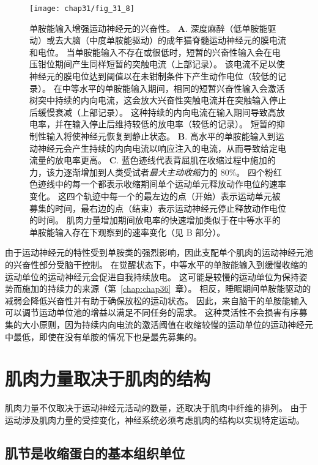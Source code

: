 \begin{figure}[htbp]
	\centering
	\texttt{[image: chap31/fig\_31\_8]}
	\caption{单胺能输入增强运动神经元的兴奋性\cite{heckman2009motoneuron,erim1996rank}。
	\textbf{A}. 深度麻醉（低单胺能驱动）或去大脑（中度单胺能驱动）的成年猫脊髓运动神经元的膜电流和电位。
	当单胺能输入不存在或很低时，短暂的兴奋性输入会在电压钳位期间产生同样短暂的突触电流（上部记录）。
	该电流不足以使神经元的膜电位达到阈值以在未钳制条件下产生动作电位（较低的记录）。
	在中等水平的单胺能输入期间，相同的短暂兴奋性输入会激活树突中持续的内向电流，这会放大兴奋性突触电流并在突触输入停止后缓慢衰减（上部记录）。
	这种持续的内向电流在输入期间导致高放电率，并在输入停止后维持较低的放电率（较低的记录）。
	短暂的抑制性输入将使神经元恢复到静止状态。
	\textbf{B}. 高水平的单胺能输入到运动神经元会产生持续的内向电流以响应注入的电流，从而导致给定电流量的放电率更高。
	\textbf{C}. 蓝色迹线代表背屈肌在收缩过程中施加的力，该力逐渐增加到人类受试者\textit{最大主动收缩}力的 80\%。
	四个粉红色迹线中的每一个都表示收缩期间单个运动单元释放动作电位的速率变化。 
	这四个轨迹中每一个的最左边的点（开始）表示运动单元被募集的时间，最右边的点（结束）表示运动神经元停止释放动作电位的时间。
	肌肉力量增加期间放电率的快速增加类似于在中等水平的单胺能输入存在下观察到的速率变化（见 B 部分）。}
	\label{fig:31_8}
\end{figure}


由于运动神经元的特性受到单胺类的强烈影响，因此支配单个肌肉的运动神经元池的兴奋性部分受脑干控制。
在觉醒状态下，中等水平的单胺能输入到缓慢收缩的运动单位的运动神经元会促进自我持续放电。
这可能是较慢的运动单位为保持姿势而施加的持续力的来源（第~\ref{chap:chap36}~章）。
相反，睡眠期间单胺能驱动的减弱会降低兴奋性并有助于确保放松的运动状态。
因此，来自脑干的单胺能输入可以调节运动单位池的增益以满足不同任务的需求。
这种灵活性不会损害有序募集的大小原则，因为持续内向电流的激活阈值在收缩较慢的运动单位的运动神经元中最低，即使在没有单胺的情况下也是最先募集的。



\section{肌肉力量取决于肌肉的结构}

肌肉力量不仅取决于运动神经元活动的数量，还取决于肌肉中纤维的排列。
由于运动涉及肌肉力量的受控变化，神经系统必须考虑肌肉的结构以实现特定运动。



\subsection{肌节是收缩蛋白的基本组织单位}

